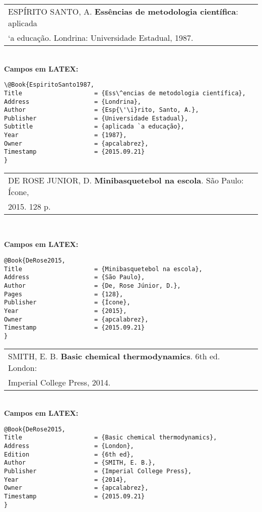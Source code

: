 \begin{tabular}{|l|c|} \hline
 ESPÍRITO SANTO, A. \textbf{Ess\^encias de metodologia científica}: aplicada \\
 `a educação. Londrina: Universidade Estadual, 1987. \\\hline
\end{tabular}\\

\textbf{Campos em LATEX:}

\begin{verbatim}
\@Book{EspiritoSanto1987,
Title                    = {Ess\^encias de metodologia científica},
Address                  = {Londrina},
Author                   = {Esp{\'\i}rito, Santo, A.},
Publisher                = {Universidade Estadual},
Subtitle                 = {aplicada `a educação},
Year                     = {1987},
Owner                    = {apcalabrez},
Timestamp                = {2015.09.21}
}
\end{verbatim}

\begin{tabular}{|l|c|} \hline
DE ROSE JUNIOR, D. \textbf{Minibasquetebol na escola}. São Paulo: Ícone, \\ 2015. 128 p. \\\hline
\end{tabular}\\

\newpage

\textbf{Campos em LATEX:}

\begin{verbatim}
@Book{DeRose2015,
Title                    = {Minibasquetebol na escola},
Address                  = {São Paulo},
Author                   = {De, Rose Júnior, D.},
Pages                    = {128},
Publisher                = {Ícone},
Year                     = {2015},
Owner                    = {apcalabrez},
Timestamp                = {2015.09.21}
}
\end{verbatim}

\begin{tabular}{|l|c|} \hline
	SMITH, E. B. \textbf{Basic chemical thermodynamics}. 6th ed. London:\\ Imperial College Press, 2014.  \\\hline
\end{tabular}\\

\textbf{Campos em LATEX:}

\begin{verbatim}
@Book{DeRose2015,
Title                    = {Basic chemical thermodynamics},
Address                  = {London},
Edition                  = {6th ed},
Author                   = {SMITH, E. B.},
Publisher                = {Imperial College Press},
Year                     = {2014},
Owner                    = {apcalabrez},
Timestamp                = {2015.09.21}
}
\end{verbatim}

